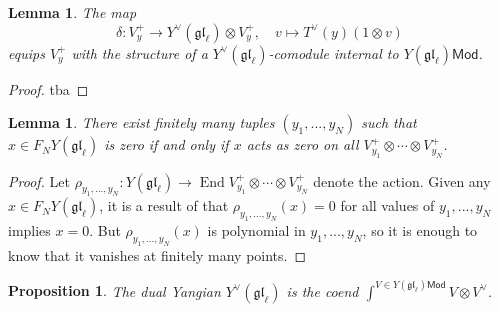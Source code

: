 \documentclass[11pt]{report}
\newtheorem{lemma}[theorem]{Lemma}
\newtheorem{prop}[theorem]{Proposition}
\theoremstyle{definition}
\theoremstyle{remark}
\theoremstyle{remark}
\newcommand{\End}{\operatorname{End}}
\begin{document}
\begin{lemma}
The map
\begin{equation*}
\delta: V_y^+ \to Y^\vee(\mathfrak{gl}_\ell) \otimes V_y^+, \quad v \mapsto T^\vee(y) (1 \otimes v)
\end{equation*}
equips $V_y^+$ with the structure of a $Y^\vee(\mathfrak{gl}_\ell)$-comodule internal to $Y(\mathfrak{gl}_\ell)\mathsf{Mod}$.
\end{lemma}

\begin{proof}
tba
\end{proof}

\begin{lemma}
There exist finitely many tuples $(y_1,...,y_N)$ such that $x \in F_N Y(\mathfrak{gl}_\ell)$ is zero if and only if $x$ acts as zero on all $V_{y_1}^+ \otimes \cdots \otimes V_{y_N}^+$.
\end{lemma}

\begin{proof}
Let $\rho_{y_1,...,y_N}: Y(\mathfrak{gl}_\ell) \to \End V_{y_1}^+ \otimes \cdots \otimes V_{y_N}^+$ denote the action. Given any $x \in F_N Y(\mathfrak{gl}_\ell)$, it is a result of \cite{article:nazarov:2019} that $\rho_{y_1,...,y_N}(x) = 0$ for all values of $y_1,...,y_N$ implies $x = 0$. But $\rho_{y_1,...,y_N}(x)$ is polynomial in $y_1,...,y_N$, so it is enough to know that it vanishes at finitely many points.
\end{proof}

\begin{prop}
The dual Yangian $Y^\vee(\mathfrak{gl}_\ell)$ is the coend $\int^{V \in Y(\mathfrak{gl}_\ell)\mathsf{Mod}} V \otimes V^\vee$.
\end{prop}
\end{document}
